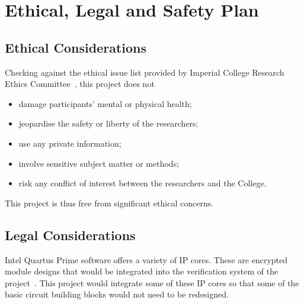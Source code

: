 \section{Ethical, Legal and Safety Plan}

\subsection{Ethical Considerations}

Checking against the ethical issue list provided by Imperial College Research
Ethics Committee~\cite{Imperial1}, this project does not
\begin{itemize}
  \item damage participants' mental or physical health;
  \item jeopardise the safety or liberty of the researchers;
  \item use any private information;
  \item involve sensitive subject matter or methods;
  \item risk any conflict of interest between the researchers and the College.
\end{itemize}
This project is thus free from significant ethical concerns.

\subsection{Legal Considerations}
Intel Quartus Prime software offers a variety of IP cores.
These are encrypted module designs that would be integrated into the
verification system of the project~\cite{Intel2}.
This project would integrate some of these IP cores so that some of the basic
circuit building blocks would not need to be redesigned.

